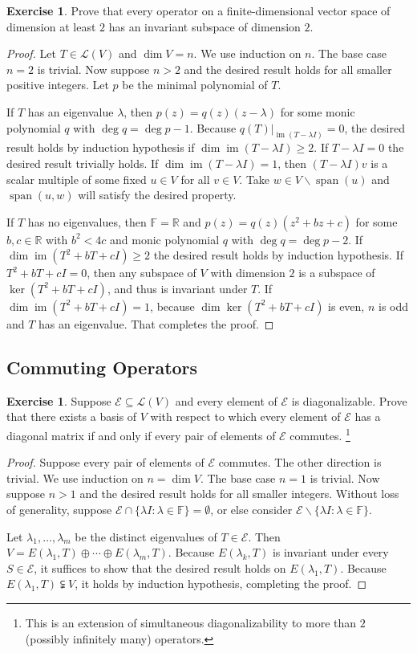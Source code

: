 \documentclass[colorlinks]{tufte-handout}
\theoremstyle{plain} %
\theoremstyle{definition}
\newtheorem{exer}[thm]{Exercise}
\theoremstyle{remark}
\newcommand{\rest}[2]{\mathopen{}\left.#1\right|_{#2}}
\newcommand{\R}{\mathbb{R}}
\newcommand{\F}{\mathbb{F}}
\renewcommand{\L}{\mathcal{L}}
\newcommand{\E}{\mathcal{E}}
\DeclareMathOperator{\spn}{span}
\DeclareMathOperator{\im}{im}
\begin{document}
\begin{exer}
	Prove that every operator on a finite-dimensional vector space of dimension at least $2$ has an invariant subspace of dimension $2$.
\end{exer}
\begin{proof}
	Let $T\in\L(V)$ and $\dim V=n$. We use induction on $n$. The base case $n=2$ is trivial. Now suppose $n>2$ and the desired result holds for all smaller positive integers. Let $p$ be the minimal polynomial of $T$.

	If $T$ has an eigenvalue $\lambda$, then $p(z)=q(z)(z-\lambda)$ for some monic polynomial $q$ with $\deg q=\deg p-1$. Because $\rest{q(T)}{\im(T-\lambda I)}=0$, the desired result holds by induction hypothesis if $\dim\im(T-\lambda I)\geq2$. If $T-\lambda I=0$ the desired result trivially holds. If $\dim\im(T-\lambda I)=1$, then $(T-\lambda I)v$ is a scalar multiple of some fixed $u\in V$ for all $v\in V$. Take $w\in V\backslash\spn(u)$ and $\spn(u,w)$ will satisfy the desired property.

	If $T$ has no eigenvalues, then $\F=\R$ and $p(z)=q(z)(z^2+bz+c)$ for some $b,c\in\R$ with $b^2<4c$ and monic polynomial $q$ with $\deg q=\deg p-2$. If $\dim\im(T^2+bT+cI)\geq2$ the desired result holds by induction hypothesis. If $T^2+bT+cI=0$, then any subspace of $V$ with dimension $2$ is a subspace of $\ker(T^2+bT+cI)$, and thus is invariant under $T$. If $\dim\im(T^2+bT+cI)=1$, because $\dim\ker(T^2+bT+cI)$ is even, $n$ is odd and $T$ has an eigenvalue. That completes the proof.
\end{proof}



\subsection{Commuting Operators}
\begin{exer}
	Suppose $\E\subseteq\L(V)$ and every element of $\E$ is diagonalizable. Prove that there exists a basis of $V$ with respect to which every element of $\E$ has a diagonal matrix if and only if every pair of elements of $\E$ commutes.%
	\footnote{This is an extension of simultaneous diagonalizability to more than $2$ (possibly infinitely many) operators.}
\end{exer}
\begin{proof}
	Suppose every pair of elements of $\E$ commutes. The other direction is trivial. We use induction on $n=\dim V$. The base case $n=1$ is trivial. Now suppose $n>1$ and the desired result holds for all smaller integers. Without loss of generality, suppose $\E\cap\{\lambda I:\lambda\in\F\}=\emptyset$, or else consider $\E\backslash\{\lambda I:\lambda\in\F\}$.

	Let $\lambda_1,\dots,\lambda_m$ be the distinct eigenvalues of $T\in\E$. Then $V=E(\lambda_1,T)\oplus\cdots\oplus E(\lambda_m,T)$. Because $E(\lambda_k,T)$ is invariant under every $S\in\E$, it suffices to show that the desired result holds on $E(\lambda_1,T)$. Because $E(\lambda_1,T)\subsetneqq V$, it holds by induction hypothesis, completing the proof.
\end{proof}
\end{document}
